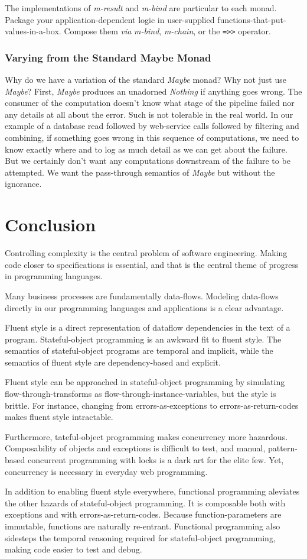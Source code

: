 \documentclass[11pt]{article}
\begin{document}
The implementations of \emph{m-result} and \emph{m-bind} are particular to
each monad. Package your application-dependent logic in
user-supplied functions-that-put-values-in-a-box. Compose them \emph{via}
\emph{m-bind}, \emph{m-chain}, or the \verb|=>>| operator.
\subsubsection{Varying from the Standard Maybe Monad}
\label{sec-3-2-3}

Why do we have a variation of the standard \emph{Maybe} monad? Why not
just use \emph{Maybe}? First, \emph{Maybe} produces an unadorned \emph{Nothing} if
anything goes wrong. The consumer of the computation doesn't know
what stage of the pipeline failed nor any details at all about the
error. Such is not tolerable in the real world. In our example of a
database read followed by web-service calls followed by filtering
and combining, if something goes wrong in this sequence of
computations, we need to know exactly where and to log as much
detail as we can get about the failure. But we certainly don't want
any computations downstream of the failure to be attempted. We
want the pass-through semantics of \emph{Maybe} but without the ignorance.
\section{Conclusion}
\label{sec-4}

Controlling complexity is the central problem of software
engineering. Making code closer to specifications is essential, and
that is the central theme of progress in programming languages.

Many business processes are fundamentally data-flows. Modeling
data-flows directly in our programming languages and applications is
a clear advantage.

Fluent style is a direct representation of dataflow dependencies in
the text of a program. Stateful-object programming is an awkward fit
to fluent style. The semantics of stateful-object programs are
temporal and implicit, while the semantics of fluent style are
dependency-based and explicit.

Fluent style can be approached in stateful-object programming by
simulating flow-through-transforms as
flow-through-instance-variables, but the style is brittle. For
instance, changing from errors-as-exceptions to
errors-as-return-codes makes fluent style intractable.

Furthermore, tateful-object programming makes concurrency more
hazardous. Composability of objects and exceptions is difficult to
test, and manual, pattern-based concurrent programming with locks is
a dark art for the elite few. Yet, concurrency is necessary in
everyday web programming.

In addition to enabling fluent style everywhere, functional
programming aleviates the other hazards of stateful-object
programming. It is composable both with exceptions and with
errors-as-return-codes. Because function-parameters are immutable,
functions are naturally re-entrant. Functional programming also
sidesteps the temporal reasoning required for stateful-object
programming, making code easier to test and debug.
\end{document}

